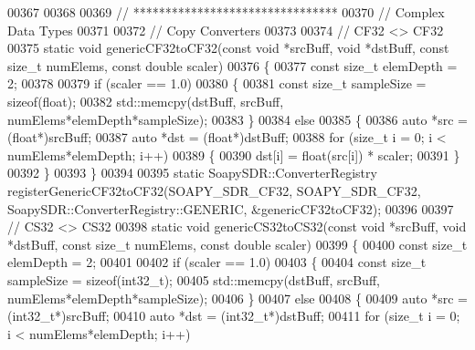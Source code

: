 \begin{DoxyCode}
00367 
00368 
00369 \textcolor{comment}{// ********************************}
00370 \textcolor{comment}{// Complex Data Types}
00371 
00372 \textcolor{comment}{// Copy Converters}
00373 
00374 \textcolor{comment}{// CF32 <> CF32}
00375 \textcolor{keyword}{static} \textcolor{keywordtype}{void} genericCF32toCF32(\textcolor{keyword}{const} \textcolor{keywordtype}{void} *srcBuff, \textcolor{keywordtype}{void} *dstBuff, \textcolor{keyword}{const} \textcolor{keywordtype}{size\_t} numElems, \textcolor{keyword}{const} \textcolor{keywordtype}{double} 
      scaler)
00376 \{
00377   \textcolor{keyword}{const} \textcolor{keywordtype}{size\_t} elemDepth = 2;
00378 
00379   \textcolor{keywordflow}{if} (scaler == 1.0)
00380     \{
00381       \textcolor{keyword}{const} \textcolor{keywordtype}{size\_t} sampleSize = \textcolor{keyword}{sizeof}(float);
00382       std::memcpy(dstBuff, srcBuff, numElems*elemDepth*sampleSize);
00383     \}
00384   \textcolor{keywordflow}{else}
00385     \{
00386       \textcolor{keyword}{auto} *src = (\textcolor{keywordtype}{float}*)srcBuff;
00387       \textcolor{keyword}{auto} *dst = (\textcolor{keywordtype}{float}*)dstBuff;
00388       \textcolor{keywordflow}{for} (\textcolor{keywordtype}{size\_t} i = 0; i < numElems*elemDepth; i++)
00389     \{
00390       dst[i] = float(src[i]) * scaler;
00391     \}
00392     \}
00393 \}
00394 
00395 \textcolor{keyword}{static} SoapySDR::ConverterRegistry registerGenericCF32toCF32(SOAPY_SDR_CF32, 
      SOAPY_SDR_CF32, SoapySDR::ConverterRegistry::GENERIC, &genericCF32toCF32);
00396 
00397 \textcolor{comment}{// CS32 <> CS32}
00398 \textcolor{keyword}{static} \textcolor{keywordtype}{void} genericCS32toCS32(\textcolor{keyword}{const} \textcolor{keywordtype}{void} *srcBuff, \textcolor{keywordtype}{void} *dstBuff, \textcolor{keyword}{const} \textcolor{keywordtype}{size\_t} numElems, \textcolor{keyword}{const} \textcolor{keywordtype}{double} 
      scaler)
00399 \{
00400   \textcolor{keyword}{const} \textcolor{keywordtype}{size\_t} elemDepth = 2;
00401 
00402   \textcolor{keywordflow}{if} (scaler == 1.0)
00403     \{
00404       \textcolor{keyword}{const} \textcolor{keywordtype}{size\_t} sampleSize = \textcolor{keyword}{sizeof}(int32\_t);
00405       std::memcpy(dstBuff, srcBuff, numElems*elemDepth*sampleSize);
00406     \}
00407   \textcolor{keywordflow}{else}
00408     \{
00409       \textcolor{keyword}{auto} *src = (int32\_t*)srcBuff;
00410       \textcolor{keyword}{auto} *dst = (int32\_t*)dstBuff;
00411       \textcolor{keywordflow}{for} (\textcolor{keywordtype}{size\_t} i = 0; i < numElems*elemDepth; i++)

\end{DoxyCode}
